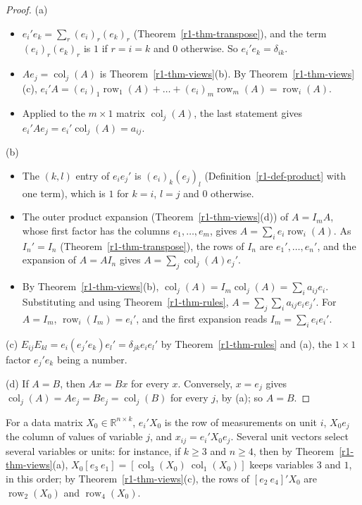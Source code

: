 \documentclass[12pt]{article}
\newcommand{\R}{\mathbb R}
\DeclareMathOperator{\row}{row}
\DeclareMathOperator{\col}{col}
\theoremstyle{definition}
\begin{document}
\begin{proof}
(a)
\begin{itemize}
\item \(e_i'e_k=\sum_r(e_i)_r(e_k)_r\) (Theorem~\ref{r1-thm-transpose}), and the term \((e_i)_r(e_k)_r\) is \(1\) if
\(r=i=k\) and \(0\) otherwise. So \(e_i'e_k=\delta_{ik}\).
\item \(Ae_j=\col_j(A)\) is Theorem~\ref{r1-thm-views}(b). By Theorem~\ref{r1-thm-views}(c),
\(e_i'A=(e_i)_1\row_1(A)+\dots+(e_i)_m\row_m(A)=\row_i(A)\).
\item Applied to the \(m\times1\) matrix \(\col_j(A)\), the last statement gives \(e_i'Ae_j=e_i'\col_j(A)=a_{ij}\).
\end{itemize}
(b)
\begin{itemize}
\item The \((k,l)\) entry of \(e_ie_j'\) is \((e_i)_k(e_j)_l\) (Definition~\ref{r1-def-product} with one term), which is
\(1\) for \(k=i\), \(l=j\) and \(0\) otherwise.
\item The outer product expansion (Theorem~\ref{r1-thm-views}(d)) of \(A=I_mA\), whose first factor has the columns
\(e_1,\dots,e_m\), gives \(A=\sum_ie_i\row_i(A)\). As \(I_n'=I_n\) (Theorem~\ref{r1-thm-transpose}), the rows of
\(I_n\) are \(e_1',\dots,e_n'\), and
the expansion of \(A=AI_n\) gives \(A=\sum_j\col_j(A)e_j'\).
\item By Theorem~\ref{r1-thm-views}(b), \(\col_j(A)=I_m\col_j(A)=\sum_ia_{ij}e_i\). Substituting and using
Theorem~\ref{r1-thm-rules}, \(A=\sum_j\sum_ia_{ij}e_ie_j'\). For \(A=I_m\), \(\row_i(I_m)=e_i'\), and the first
expansion reads \(I_m=\sum_ie_ie_i'\).
\end{itemize}
(c) \(E_{ij}E_{kl}=e_i(e_j'e_k)e_l'=\delta_{jk}e_ie_l'\) by Theorem~\ref{r1-thm-rules} and (a), the \(1\times1\)
factor \(e_j'e_k\) being a number.

(d) If \(A=B\), then \(Ax=Bx\) for every \(x\). Conversely, \(x=e_j\) gives \(\col_j(A)=Ae_j=Be_j=\col_j(B)\) for
every \(j\), by (a); so \(A=B\).
\end{proof}

For a data matrix \(X_0\in\R^{n\times k}\), \(e_i'X_0\) is the row of measurements on unit \(i\), \(X_0e_j\) the column
of values of variable \(j\), and \(x_{ij}=e_i'X_0e_j\). Several unit vectors select several variables or units: for
instance, if \(k\geqslant3\) and \(n\geqslant4\), then by
Theorem~\ref{r1-thm-views}(a), \(X_0[e_3\ e_1]=[\col_3(X_0)\ \col_1(X_0)]\) keeps variables \(3\) and \(1\), in this
order; by Theorem~\ref{r1-thm-views}(c), the rows of \([e_2\ e_4]'X_0\) are \(\row_2(X_0)\) and \(\row_4(X_0)\).
\end{document}
